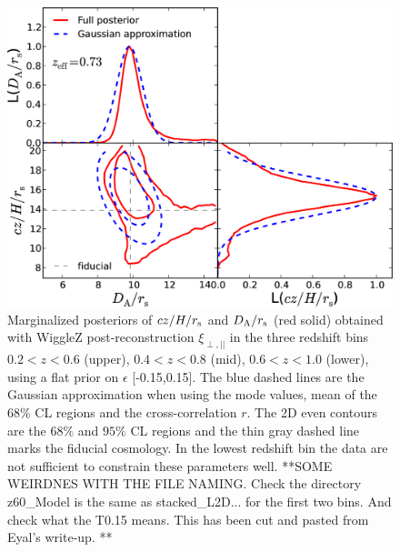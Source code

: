 \documentclass[iop,twocolappendix]{emulateapj}
\newcommand{\red}{\color{red}}
\begin{document}
\begin{figure}
\begin{center}
\includegraphics[width=0.9\columnwidth]{figures/z60_Model/stacked_L2D_rpt_wedges_postRec_T015_WiggleZ_z0pt6_1pt0.png}
\caption{\label{fig:HDA_z26_epsilon0.15} Marginalized posteriors of $cz/H/r_{\rm s}$ and $D_{\rm A}/r_{\rm s}$ (red solid) obtained with WiggleZ post-reconstruction $\xi_{\perp, ||}$ in the three redshift bins $0.2<z<0.6$ (upper), $0.4<z<0.8$ (mid), $0.6<z<1.0$ (lower), using a flat prior on $\epsilon$ [-0.15,0.15].  The blue dashed lines are the Gaussian approximation when using the mode values, mean of the 68$\%$ CL regions and the cross-correlation $r$. The 2D even contours are the $68\%$ and $95\%$ CL regions and the thin gray dashed line marks the fiducial cosmology.  In the lowest redshift bin the data are not sufficient to constrain these parameters well.%
{\red **SOME WEIRDNES WITH THE FILE NAMING.  Check the directory z60\_Model is the same as stacked\_L2D... for the first two bins.  And check what the T0.15 means.  This has been cut and pasted from Eyal's write-up. **}
}
\end{center}
\end{figure}
\end{document}
